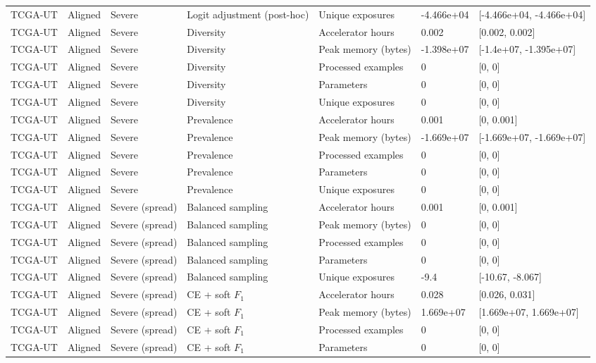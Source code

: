 \begin{longtable}{lllllll}
TCGA-UT & Aligned & Severe & Logit adjustment (post-hoc) & Unique exposures & -4.466e+04 & [-4.466e+04, -4.466e+04] \\
TCGA-UT & Aligned & Severe & Diversity & Accelerator hours & 0.002 & [0.002, 0.002] \\
TCGA-UT & Aligned & Severe & Diversity & Peak memory (bytes) & -1.398e+07 & [-1.4e+07, -1.395e+07] \\
TCGA-UT & Aligned & Severe & Diversity & Processed examples & 0 & [0, 0] \\
TCGA-UT & Aligned & Severe & Diversity & Parameters & 0 & [0, 0] \\
TCGA-UT & Aligned & Severe & Diversity & Unique exposures & 0 & [0, 0] \\
TCGA-UT & Aligned & Severe & Prevalence & Accelerator hours & 0.001 & [0, 0.001] \\
TCGA-UT & Aligned & Severe & Prevalence & Peak memory (bytes) & -1.669e+07 & [-1.669e+07, -1.669e+07] \\
TCGA-UT & Aligned & Severe & Prevalence & Processed examples & 0 & [0, 0] \\
TCGA-UT & Aligned & Severe & Prevalence & Parameters & 0 & [0, 0] \\
TCGA-UT & Aligned & Severe & Prevalence & Unique exposures & 0 & [0, 0] \\
TCGA-UT & Aligned & Severe (spread) & Balanced sampling & Accelerator hours & 0.001 & [0, 0.001] \\
TCGA-UT & Aligned & Severe (spread) & Balanced sampling & Peak memory (bytes) & 0 & [0, 0] \\
TCGA-UT & Aligned & Severe (spread) & Balanced sampling & Processed examples & 0 & [0, 0] \\
TCGA-UT & Aligned & Severe (spread) & Balanced sampling & Parameters & 0 & [0, 0] \\
TCGA-UT & Aligned & Severe (spread) & Balanced sampling & Unique exposures & -9.4 & [-10.67, -8.067] \\
TCGA-UT & Aligned & Severe (spread) & CE + soft $F_1$ & Accelerator hours & 0.028 & [0.026, 0.031] \\
TCGA-UT & Aligned & Severe (spread) & CE + soft $F_1$ & Peak memory (bytes) & 1.669e+07 & [1.669e+07, 1.669e+07] \\
TCGA-UT & Aligned & Severe (spread) & CE + soft $F_1$ & Processed examples & 0 & [0, 0] \\
TCGA-UT & Aligned & Severe (spread) & CE + soft $F_1$ & Parameters & 0 & [0, 0] \\

\end{longtable}
